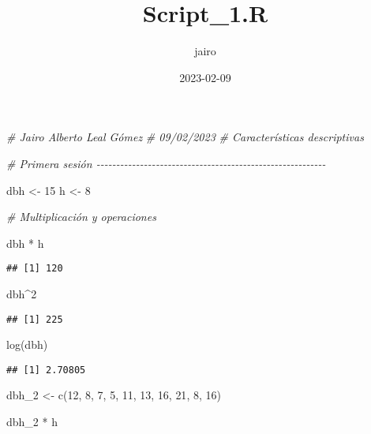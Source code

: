 \documentclass[
]{article}
\title{Script\_1.R}
\author{jairo}
\date{2023-02-09}
\newenvironment{Shaded}{\begin{snugshade}}{\end{snugshade}}
\newcommand{\CommentTok}[1]{\textcolor[rgb]{0.56,0.35,0.01}{\textit{#1}}}
\newcommand{\DecValTok}[1]{\textcolor[rgb]{0.00,0.00,0.81}{#1}}
\newcommand{\FunctionTok}[1]{\textcolor[rgb]{0.00,0.00,0.00}{#1}}
\newcommand{\NormalTok}[1]{#1}
\newcommand{\OtherTok}[1]{\textcolor[rgb]{0.56,0.35,0.01}{#1}}
\newcommand{\SpecialCharTok}[1]{\textcolor[rgb]{0.00,0.00,0.00}{#1}}
\begin{document}
\maketitle

\begin{Shaded}
\begin{Highlighting}[]
\CommentTok{\# Jairo Alberto Leal Gómez}
\CommentTok{\# 09/02/2023}
\CommentTok{\# Características descriptivas}


\CommentTok{\# Primera sesión {-}{-}{-}{-}{-}{-}{-}{-}{-}{-}{-}{-}{-}{-}{-}{-}{-}{-}{-}{-}{-}{-}{-}{-}{-}{-}{-}{-}{-}{-}{-}{-}{-}{-}{-}{-}{-}{-}{-}{-}{-}{-}{-}{-}{-}{-}{-}{-}{-}{-}{-}{-}{-}{-}{-}{-}{-}{-}}

\NormalTok{dbh }\OtherTok{\textless{}{-}} \DecValTok{15}
\NormalTok{h }\OtherTok{\textless{}{-}} \DecValTok{8}

\CommentTok{\# Multiplicación y operaciones}

\NormalTok{dbh }\SpecialCharTok{*}\NormalTok{ h}
\end{Highlighting}
\end{Shaded}

\begin{verbatim}
## [1] 120
\end{verbatim}

\begin{Shaded}
\begin{Highlighting}[]
\NormalTok{dbh}\SpecialCharTok{\^{}}\DecValTok{2}
\end{Highlighting}
\end{Shaded}

\begin{verbatim}
## [1] 225
\end{verbatim}

\begin{Shaded}
\begin{Highlighting}[]
\FunctionTok{log}\NormalTok{(dbh)}
\end{Highlighting}
\end{Shaded}

\begin{verbatim}
## [1] 2.70805
\end{verbatim}

\begin{Shaded}
\begin{Highlighting}[]
\NormalTok{dbh\_2 }\OtherTok{\textless{}{-}} \FunctionTok{c}\NormalTok{(}\DecValTok{12}\NormalTok{, }\DecValTok{8}\NormalTok{, }\DecValTok{7}\NormalTok{, }\DecValTok{5}\NormalTok{, }\DecValTok{11}\NormalTok{, }\DecValTok{13}\NormalTok{, }\DecValTok{16}\NormalTok{, }\DecValTok{21}\NormalTok{, }\DecValTok{8}\NormalTok{, }\DecValTok{16}\NormalTok{) }

\NormalTok{dbh\_2 }\SpecialCharTok{*}\NormalTok{ h}
\end{Highlighting}
\end{Shaded}
\end{document}
